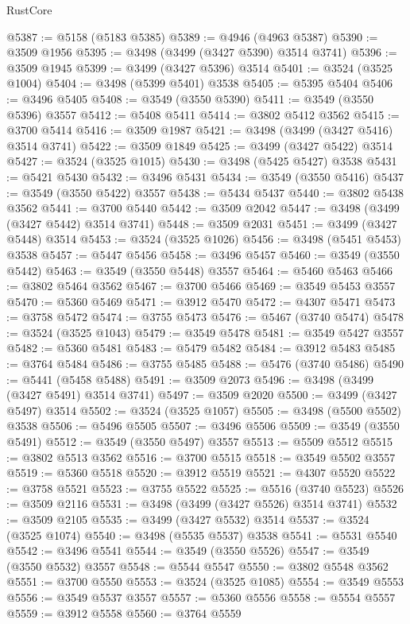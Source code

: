 \begin{lexlean}{RustCore}
\begin{coremodule}
@5387 := @5158 (@5183 @5385)
@5389 := @4946 (@4963 @5387)
@5390 := @3509 @1956
@5395 := @3498 (@3499 (@3427 @5390) @3514 @3741)
@5396 := @3509 @1945
@5399 := @3499 (@3427 @5396) @3514
@5401 := @3524 (@3525 @1004)
@5404 := @3498 (@5399 @5401) @3538
@5405 := @5395 @5404
@5406 := @3496 @5405
@5408 := @3549 (@3550 @5390)
@5411 := @3549 (@3550 @5396) @3557
@5412 := @5408 @5411
@5414 := @3802 @5412 @3562
@5415 := @3700 @5414
@5416 := @3509 @1987
@5421 := @3498 (@3499 (@3427 @5416) @3514 @3741)
@5422 := @3509 @1849
@5425 := @3499 (@3427 @5422) @3514
@5427 := @3524 (@3525 @1015)
@5430 := @3498 (@5425 @5427) @3538
@5431 := @5421 @5430
@5432 := @3496 @5431
@5434 := @3549 (@3550 @5416)
@5437 := @3549 (@3550 @5422) @3557
@5438 := @5434 @5437
@5440 := @3802 @5438 @3562
@5441 := @3700 @5440
@5442 := @3509 @2042
@5447 := @3498 (@3499 (@3427 @5442) @3514 @3741)
@5448 := @3509 @2031
@5451 := @3499 (@3427 @5448) @3514
@5453 := @3524 (@3525 @1026)
@5456 := @3498 (@5451 @5453) @3538
@5457 := @5447 @5456
@5458 := @3496 @5457
@5460 := @3549 (@3550 @5442)
@5463 := @3549 (@3550 @5448) @3557
@5464 := @5460 @5463
@5466 := @3802 @5464 @3562
@5467 := @3700 @5466
@5469 := @3549 @5453 @3557
@5470 := @5360 @5469
@5471 := @3912 @5470
@5472 := @4307 @5471
@5473 := @3758 @5472
@5474 := @3755 @5473
@5476 := @5467 (@3740 @5474)
@5478 := @3524 (@3525 @1043)
@5479 := @3549 @5478
@5481 := @3549 @5427 @3557
@5482 := @5360 @5481
@5483 := @5479 @5482
@5484 := @3912 @5483
@5485 := @3764 @5484
@5486 := @3755 @5485
@5488 := @5476 (@3740 @5486)
@5490 := @5441 (@5458 @5488)
@5491 := @3509 @2073
@5496 := @3498 (@3499 (@3427 @5491) @3514 @3741)
@5497 := @3509 @2020
@5500 := @3499 (@3427 @5497) @3514
@5502 := @3524 (@3525 @1057)
@5505 := @3498 (@5500 @5502) @3538
@5506 := @5496 @5505
@5507 := @3496 @5506
@5509 := @3549 (@3550 @5491)
@5512 := @3549 (@3550 @5497) @3557
@5513 := @5509 @5512
@5515 := @3802 @5513 @3562
@5516 := @3700 @5515
@5518 := @3549 @5502 @3557
@5519 := @5360 @5518
@5520 := @3912 @5519
@5521 := @4307 @5520
@5522 := @3758 @5521
@5523 := @3755 @5522
@5525 := @5516 (@3740 @5523)
@5526 := @3509 @2116
@5531 := @3498 (@3499 (@3427 @5526) @3514 @3741)
@5532 := @3509 @2105
@5535 := @3499 (@3427 @5532) @3514
@5537 := @3524 (@3525 @1074)
@5540 := @3498 (@5535 @5537) @3538
@5541 := @5531 @5540
@5542 := @3496 @5541
@5544 := @3549 (@3550 @5526)
@5547 := @3549 (@3550 @5532) @3557
@5548 := @5544 @5547
@5550 := @3802 @5548 @3562
@5551 := @3700 @5550
@5553 := @3524 (@3525 @1085)
@5554 := @3549 @5553
@5556 := @3549 @5537 @3557
@5557 := @5360 @5556
@5558 := @5554 @5557
@5559 := @3912 @5558
@5560 := @3764 @5559

\end{coremodule}
\end{lexlean}
